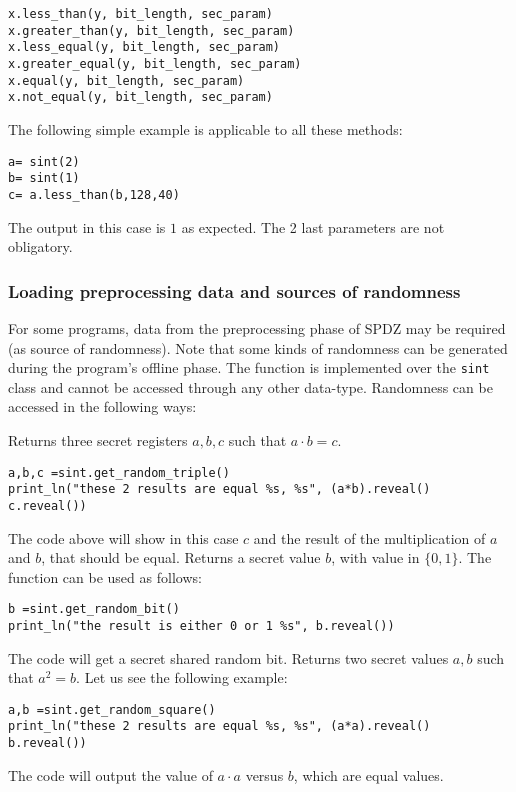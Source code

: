 \begin{lstlisting}
x.less_than(y, bit_length, sec_param)
x.greater_than(y, bit_length, sec_param)
x.less_equal(y, bit_length, sec_param)
x.greater_equal(y, bit_length, sec_param)
x.equal(y, bit_length, sec_param)
x.not_equal(y, bit_length, sec_param)
\end{lstlisting}

\noindent
The following simple example is applicable to all these methods: 
\begin{lstlisting}
a= sint(2)
b= sint(1)
c= a.less_than(b,128,40)
\end{lstlisting}
The output in this case is $1$ as expected. The 2 last parameters are not obligatory.
\subsubsection{Loading preprocessing data and sources of randomness}

For some programs, data from the preprocessing phase of SPDZ may be required (as source of randomness). Note that some kinds of randomness can  be generated during the program's offline phase. The function is implemented over the \verb|sint| class and cannot be accessed through any other data-type. Randomness can be accessed in the following ways:

Returns three secret registers $a, b, c$ such that $a\cdot b = c$.
\begin{lstlisting}
a,b,c =sint.get_random_triple()
print_ln("these 2 results are equal %s, %s", (a*b).reveal() c.reveal())
\end{lstlisting}
The code above will show in this case $c$ and the result of the multiplication of $a$ and $b$, that should be equal.
Returns a secret value $b$, with value in $\{0, 1\}$. The function can be used as follows:
\begin{lstlisting}
b =sint.get_random_bit()
print_ln("the result is either 0 or 1 %s", b.reveal())
\end{lstlisting}
The code will get a secret shared random bit.
Returns two secret values $a, b$ such that $a^2 = b$. Let us see the following example: 
\begin{lstlisting}
a,b =sint.get_random_square()
print_ln("these 2 results are equal %s, %s", (a*a).reveal() b.reveal())
\end{lstlisting}
The code will output the value of $a \cdot a$ versus $b$,  which are equal values. 

